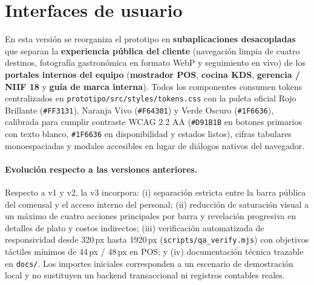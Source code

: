 
\FloatBarrier
\section{Interfaces de usuario}
\label{sec:interfaces}

\par\vspace{0.5em}

En esta versión se reorganiza el prototipo en \textbf{subaplicaciones
desacopladas} que separan la \textbf{experiencia pública del cliente}
(navegación limpia de cuatro destinos, fotografía gastronómica en formato
WebP y seguimiento en vivo) de los \textbf{portales internos del equipo}
(\textbf{mostrador POS}, \textbf{cocina KDS}, \textbf{gerencia / NIIF 18} y
\textbf{guía de marca interna}). Todos los componentes consumen tokens
centralizados en \texttt{prototipo/src/styles/tokens.css} con la paleta
oficial Rojo Brillante (\texttt{\#FF3131}), Naranja Vivo (\texttt{\#F64301})
y Verde Oscuro (\texttt{\#1F6636}), calibrada para cumplir contraste WCAG 2.2 AA
(\texttt{\#D91B1B} en botones primarios con texto blanco, \texttt{\#1F6636} en
disponibilidad y estados listos), cifras tabulares monoespaciadas y modales
accesibles en lugar de diálogos nativos del navegador.

\paragraph{Evolución respecto a las versiones anteriores.} Respecto a v1 y v2,
la v3 incorpora: (i) separación estricta entre la barra pública del comensal
y el acceso interno del personal; (ii) reducción de saturación visual a un
máximo de cuatro acciones principales por barra y revelación progresiva en
detalles de plato y costos indirectos; (iii) verificación automatizada de
responsividad desde 320\,px hasta 1920\,px (\texttt{scripts/qa\_verify.mjs})
con objetivos táctiles mínimos de 44\,px / 48\,px en POS; y (iv) documentación
técnica trazable en \texttt{docs/}. Los importes iniciales corresponden a un
escenario de demostración local y no sustituyen un backend transaccional ni
registros contables reales.

